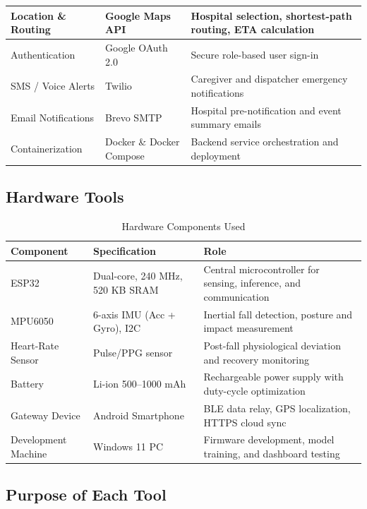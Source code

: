 \begin{table}[htb]
\begin{tabular}{|p{3.5cm}|p{3.8cm}|p{5cm}|}
	Location \& Routing & Google Maps API & Hospital selection, shortest-path routing, ETA calculation \\
	\hline
	Authentication & Google OAuth 2.0 & Secure role-based user sign-in \\
	\hline
	SMS / Voice Alerts & Twilio & Caregiver and dispatcher emergency notifications \\
	\hline
	Email Notifications & Brevo SMTP & Hospital pre-notification and event summary emails \\
	\hline
	Containerization & Docker \& Docker Compose & Backend service orchestration and deployment \\
	\hline
\end{tabular}
\end{table}

\subsection{Hardware Tools}

\begin{table}[htb]
\fontsize{10}{12}\selectfont
\caption{Hardware Components Used}
\label{tab:hardware}
\centering
\begin{tabular}{|p{4cm}|p{4cm}|p{4.5cm}|}
	\hline
	\textbf{Component} & \textbf{Specification} & \textbf{Role} \\
	\hline
	ESP32 & Dual-core, 240 MHz, 520 KB SRAM & Central microcontroller for sensing, inference, and communication \\
	\hline
	MPU6050 & 6-axis IMU (Acc + Gyro), I2C & Inertial fall detection, posture and impact measurement \\
	\hline
	Heart-Rate Sensor & Pulse/PPG sensor & Post-fall physiological deviation and recovery monitoring \\
	\hline
	Battery & Li-ion 500--1000 mAh & Rechargeable power supply with duty-cycle optimization \\
	\hline
	Gateway Device & Android Smartphone & BLE data relay, GPS localization, HTTPS cloud sync \\
	\hline
	Development Machine & Windows 11 PC & Firmware development, model training, and dashboard testing \\
	\hline
\end{tabular}
\end{table}

\subsection{Purpose of Each Tool}

